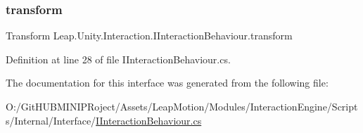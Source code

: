 \subsubsection{\texorpdfstring{transform}{transform}}
{\footnotesize\ttfamily Transform Leap.\+Unity.\+Interaction.\+I\+Interaction\+Behaviour.\+transform\hspace{0.3cm}{\ttfamily [get]}}



Definition at line 28 of file I\+Interaction\+Behaviour.\+cs.



The documentation for this interface was generated from the following file\+:\begin{DoxyCompactItemize}
\item 
O\+:/\+Git\+H\+U\+B\+M\+I\+N\+I\+P\+Roject/\+Assets/\+Leap\+Motion/\+Modules/\+Interaction\+Engine/\+Scripts/\+Internal/\+Interface/\mbox{\hyperlink{_i_interaction_behaviour_8cs}{I\+Interaction\+Behaviour.\+cs}}\end{DoxyCompactItemize}
